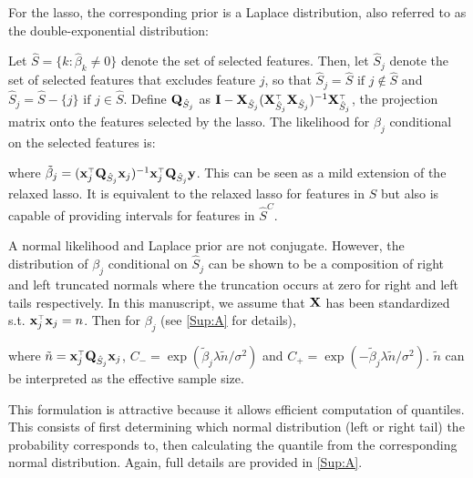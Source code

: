 For the lasso, the corresponding prior is a Laplace distribution, also referred to as the double-exponential distribution:

Let $\hat{S} = \lbrace k: \hat{\beta}_k \neq  0 \rbrace$ denote the set of selected features. Then, let $\hat{S}_j$ denote the set of selected features that excludes feature $j$, so that $\hat{S}_j = \hat{S} \text{ if } j \notin \hat{S}$ and $\hat{S}_j = \hat{S} - \lbrace j \rbrace \text{ if } j \in \hat{S}$. Define $\mathbf{Q}_{\hat{S}_j}$ as $\mathbf{I} - \mathbf{X}_{\hat{S}_j}(\mathbf{X}_{\hat{S}_j} ^{\scriptscriptstyle\top} \mathbf{X}_{\hat{S}_j})^{-1} \mathbf{X}_{\hat{S}_j} ^{\scriptscriptstyle\top}$, the projection matrix onto the features selected by the lasso. The likelihood for $\beta_j$ conditional on the selected features is:


\noindent where $\tilde{\beta}_j = (\mathbf{x}_j ^{\scriptscriptstyle\top} \mathbf{Q}_{\hat{S}_j} \mathbf{x}_j)^{-1} \mathbf{x}_j ^{\scriptscriptstyle\top} \mathbf{Q}_{\hat{S}_j} \mathbf{y}$.  This can be seen as a mild extension of the relaxed lasso. It is equivalent to the relaxed lasso for features in $\hat{S}$ but also is capable of providing intervals for features in $\hat{S}^C$.

A normal likelihood and Laplace prior are not conjugate. However, the distribution of $\beta_j$ conditional on $\hat{S}_j $ can be shown to be a composition of right and left truncated normals where the truncation occurs at zero for right and left tails respectively. In this manuscript, we assume that $\mathbf{X}$ has been standardized s.t. $\mathbf{x}_j ^{\scriptscriptstyle\top}\mathbf{x}_j = n$. Then for $\beta_j$ (see \ref{Sup:A} for details),

where $\tilde{n} = \mathbf{x}_j ^{\scriptscriptstyle\top} \mathbf{Q}_{\hat{S}_j} \mathbf{x}_j$, $C_{-} = \exp(\tilde{\beta}_j \lambda \tilde{n}/\sigma^2)$ and $C_{+} = \exp(-\tilde{\beta}_j \lambda \tilde{n}/\sigma^2)$. $\tilde{n}$ can be interpreted as the effective sample size.

This formulation is attractive because it allows efficient computation of quantiles. This consists of first determining which normal distribution (left or right tail) the probability corresponds to, then calculating the quantile from the corresponding normal distribution. Again, full details are provided in \ref{Sup:A}.

